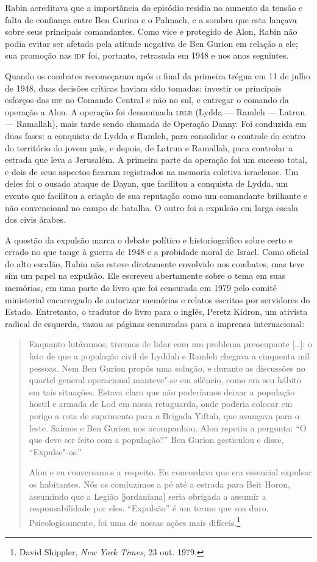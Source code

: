 Rabin acreditava que a importância do episódio residia no aumento da
tensão e falta de confiança entre Ben Gurion e o Palmach, e a sombra que
esta lançava sobre seus principais comandantes. Como vice e protegido de
Alon, Rabin não podia evitar ser afetado pela atitude negativa de Ben
Gurion em relação a ele; sua promoção nas \textsc{idf} foi, portanto, retrasada
em 1948 e nos anos seguintes.

Quando os combates recomeçaram após o final da primeira trégua em 11 de
julho de 1948, duas decisões críticas haviam sido tomadas: investir os
principais esforços das \textsc{idf} no Comando Central e não no sul, e entregar
o comando da operação a Alon. A operação foi denominada \textsc{lrlr} (Lydda ---
Ramleh --- Latrun --- Ramallah), mais tarde sendo chamada de Operação
Danny. Foi conduzida em duas fases: a conquista de Lydda e Ramleh, para
consolidar o controle do centro do território do jovem país, e depois,
de Latrun e Ramallah, para controlar a estrada que leva a Jerusalém. A
primeira parte da operação foi um sucesso total, e dois de seus aspectos
ficaram registrados na memoria coletiva israelense. Um deles foi o
ousado ataque de Dayan, que facilitou a conquista de Lydda, um evento
que facilitou a criação de sua reputação como um comandante brilhante e
não convencional no campo de batalha. O outro foi a expulsão em larga
escala dos civis árabes.

A questão da expulsão marca o debate político e historiográfico
sobre certo e errado no que tange à guerra de 1948 e a probidade
moral de Israel. Como oficial do alto escalão, Rabin não esteve
diretamente envolvido nos combates, mas teve sim um papel na expulsão.
Ele escreveu abertamente sobre o tema em suas memórias, em uma parte do
livro que foi censurada em 1979 pelo comitê ministerial encarregado de
autorizar memórias e relatos escritos por servidores do Estado.
Entretanto, o tradutor do livro para o inglês, Peretz Kidron, um
ativista radical de esquerda, vazou as páginas censuradas para a
imprensa internacional:

\begin{quote}
Enquanto lutávamos, tivemos de lidar com um problema preocupante {[}\ldots{}{]}: o
fato de que a população civil de Lyddah e Ramleh chegava a cinquenta mil
pessoas. Nem Ben Gurion propôs uma solução, e durante as discussões no
quartel general operacional manteve"-se em silêncio, como era seu hábito
em tais situações. Estava claro que não poderíamos deixar a população
hostil e armada de Lod em nossa retaguarda, onde poderia colocar em
perigo a rota de suprimento para a Brigada Yiftah, que avançava para o
leste. Saímos e Ben Gurion nos acompanhou. Alon repetiu a pergunta: ``O
que deve ser feito com a população?'' Ben Gurion gesticulou e disse, %
``Expulse"-os.''

Alon e eu conversamos a respeito. Eu concordava que era essencial
expulsar os habitantes. Nós os conduzimos a pé até a estrada para Beit
Horon, assumindo que a Legião {[}jordaniana{]} seria obrigada a assumir a
responsabilidade por eles. ``Expulsão'' é um termo que soa duro.
Psicologicamente, foi uma de nossas ações mais difíceis.\footnote{David Shippler, \textit{New York Times}, 23 out. 1979.}
\end{quote}

